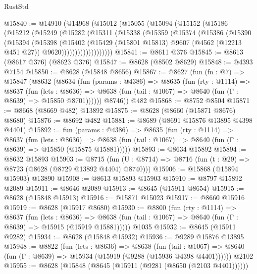 \begin{lexlean}{RustStd}
\begin{coremodule}
@15840 := @14910
    (@14968
      (@15012
        (@15055
          (@15094
            (@15152
              (@15186
                (@15212
                  (@15249
                    (@15282
                      (@15311
                        (@15338
                          (@15359
                            (@15374
                              (@15386
                                (@15390
                                  (@15394
                                    (@15398
                                      (@15402
                                        (@15429
                                          (@15801 @15813)
                                          @9607
                                          (@4562 (@12213 @451 @27))
                                          @9620)))))))))))))))))))
@15841 := @8611 @376
@15845 := @8613 (@8617 @376) (@8623 @376)
@15847 := @8628 (@8502 @8629)
@15848 := @4393 @7154
@15850 := @8628 (@15848 @8656)
@15867 := @8627
    (fun (fn : @7) =>
    @15847
      (@8632
        (@8634
          (fun (params : @4386) =>
          @8635
            (fun (rty : @1114) =>
            @8637
              (fun (lets : @8636) =>
              @8638 (fun (tail : @1067) => @8640 (fun (Γ : @8639) => @15850 @8701))))))
        @8746))
    @482
@15868 := @8752 @8504
@15871 := @8668 (@8669 @482) @13892
@15875 := @8628 (@8660 (@15871 @8676) @8680)
@15876 := @8692 @482
@15881 := @8689 (@8691 @15876 @13895 @4398 @4401)
@15892 := fun (params : @4386) =>
  @8635
    (fun (rty : @1114) =>
    @8637
      (fun (lets : @8636) =>
      @8638 (fun (tail : @1067) => @8640 (fun (Γ : @8639) => @15850 (@15875 @15881)))))
@15893 := @8634 @15892
@15894 := @8632 @15893
@15903 := @8715
    (fun (U : @8714) => @8716 (fun (t : @29) => @8723 (@8628 (@8729 @13892 @4404) @8740)))
@15906 := @15868 (@15894 @15903) @13890
@15908 := @8613 @15893 @15903
@15910 := @8797 @15892 @2089
@15911 := @8646 @2089
@15913 := @8645 (@15911 @8654)
@15915 := @8628 (@15848 @15913)
@15916 := @15871 @15023
@15917 := @8660 @15916
@15919 := @8628 (@15917 @8680)
@15930 := @8800
    (fun (rty : @1114) =>
    @8637
      (fun (lets : @8636) =>
      @8638 (fun (tail : @1067) => @8640 (fun (Γ : @8639) => @15915 (@15919 @15881)))))
    @1035
@15932 := @8645 (@15911 @9282)
@15934 := @8628 (@15848 @15932)
@15936 := @9289 @15876 @13895
@15948 := @8822
    (fun (lets : @8636) =>
    @8638
      (fun (tail : @1067) =>
      @8640 (fun (Γ : @8639) => @15934 (@15919 (@9288 (@15936 @4398 @4401))))))
    @2102
@15955 := @8628 (@15848 (@8645 (@15911 (@9281 (@8650 (@2103 @4401))))))

\end{coremodule}
\end{lexlean}
